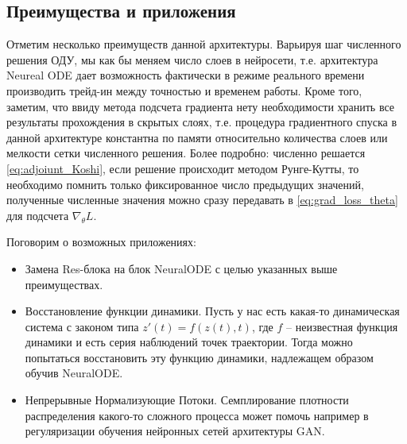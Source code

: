 \documentclass[]{scrartcl}
\begin{document}
\subsection{Преимущества и приложения}
Отметим несколько преимуществ данной архитектуры. Варьируя шаг численного решения ОДУ, мы как бы меняем число слоев в нейросети, т.е. архитектура Neureal ODE дает возможность фактически в режиме реального времени производить трейд-ин между точностью и временем работы. Кроме того, заметим, что ввиду метода подсчета градиента нету необходимости хранить все результаты прохождения в скрытых слоях, т.е. процедура градиентного спуска в данной архитектуре константна по памяти относительно количества слоев или мелкости сетки численного решения. Более подробно: численно решается \eqref{eq:adjoiunt_Koshi}, если решение происходит методом Рунге-Кутты, то необходимо помнить только фиксированное число предыдущих значений, полученные численные значения можно сразу передавать в \eqref{eq:grad_loss_theta} для подсчета $\nabla_{\theta} L$.

Поговорим о возможных приложениях:
\begin{itemize}
\item Замена Res-блока на блок NeuralODE с целью указанных выше преимуществах.
\item Восстановление функции динамики. Пусть у нас есть какая-то динамическая система с законом типа $z'(t) = f(z(t), t)$, где $f$ -- неизвестная функция динамики и есть серия наблюдений точек траектории. Тогда можно попытаться восстановить эту функцию динамики, надлежащем образом обучив NeuralODE.
\item Непрерывные Нормализующие Потоки. Семплирование плотности распределения какого-то сложного процесса может помочь например в регуляризации обучения нейронных сетей архитектуры GAN.
\end{itemize} 
\end{document}
